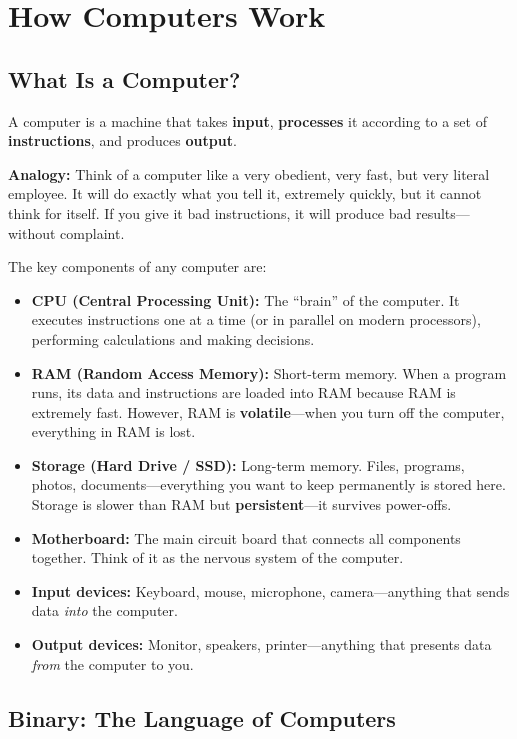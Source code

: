 \documentclass[12pt, a4paper, oneside]{book}
\begin{document}
\section{How Computers Work}

\subsection{What Is a Computer?}

A computer is a machine that takes \textbf{input}, \textbf{processes} it according to a set of \textbf{instructions}, and produces \textbf{output}.

\textbf{Analogy:} Think of a computer like a very obedient, very fast, but very literal employee. It will do exactly what you tell it, extremely quickly, but it cannot think for itself. If you give it bad instructions, it will produce bad results---without complaint.

The key components of any computer are:

\begin{itemize}[leftmargin=2em]
    \item \textbf{CPU (Central Processing Unit):} The ``brain'' of the computer. It executes instructions one at a time (or in parallel on modern processors), performing calculations and making decisions.
    \item \textbf{RAM (Random Access Memory):} Short-term memory. When a program runs, its data and instructions are loaded into RAM because RAM is extremely fast. However, RAM is \textbf{volatile}---when you turn off the computer, everything in RAM is lost.
    \item \textbf{Storage (Hard Drive / SSD):} Long-term memory. Files, programs, photos, documents---everything you want to keep permanently is stored here. Storage is slower than RAM but \textbf{persistent}---it survives power-offs.
    \item \textbf{Motherboard:} The main circuit board that connects all components together. Think of it as the nervous system of the computer.
    \item \textbf{Input devices:} Keyboard, mouse, microphone, camera---anything that sends data \emph{into} the computer.
    \item \textbf{Output devices:} Monitor, speakers, printer---anything that presents data \emph{from} the computer to you.
\end{itemize}

\subsection{Binary: The Language of Computers}
\end{document}
